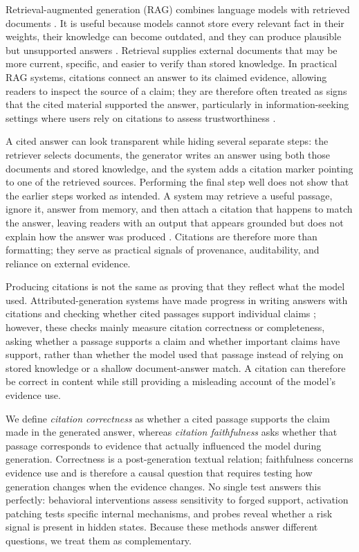 \documentclass[a4paper,fleqn]{cas-sc}
\begin{document}
Retrieval-augmented generation (RAG) combines language models with retrieved documents \cite{lewis2020rag,guu2020realm,izacard2021fid}. It is useful because models cannot store every relevant fact in their weights, their knowledge can become outdated, and they can produce plausible but unsupported answers \cite{mallen2023popqa,ji2023hallucination}. Retrieval supplies external documents that may be more current, specific, and easier to verify than stored knowledge. In practical RAG systems, citations connect an answer to its claimed evidence, allowing readers to inspect the source of a claim; they are therefore often treated as signs that the cited material supported the answer, particularly in information-seeking settings where users rely on citations to assess trustworthiness \cite{liu2023verifiability}.

A cited answer can look transparent while hiding several separate steps: the retriever selects documents, the generator writes an answer using both those documents and stored knowledge, and the system adds a citation marker pointing to one of the retrieved sources. Performing the final step well does not show that the earlier steps worked as intended. A system may retrieve a useful passage, ignore it, answer from memory, and then attach a citation that happens to match the answer, leaving readers with an output that appears grounded but does not explain how the answer was produced \cite{wallat2025correctness}. Citations are therefore more than formatting; they serve as practical signals of provenance, auditability, and reliance on external evidence.

Producing citations is not the same as proving that they reflect what the model used. Attributed-generation systems have made progress in writing answers with citations and checking whether cited passages support individual claims \cite{gao2023citations,liu2023verifiability}; however, these checks mainly measure citation correctness or completeness, asking whether a passage supports a claim and whether important claims have support, rather than whether the model used that passage instead of relying on stored knowledge or a shallow document-answer match. A citation can therefore be correct in content while still providing a misleading account of the model's evidence use.

We define \emph{citation correctness} as whether a cited passage supports the claim made in the generated answer, whereas \emph{citation faithfulness} asks whether that passage corresponds to evidence that actually influenced the model during generation. Correctness is a post-generation textual relation; faithfulness concerns evidence use and is therefore a causal question that requires testing how generation changes when the evidence changes. No single test answers this perfectly: behavioral interventions assess sensitivity to forged support, activation patching tests specific internal mechanisms, and probes reveal whether a risk signal is present in hidden states. Because these methods answer different questions, we treat them as complementary.
\end{document}
